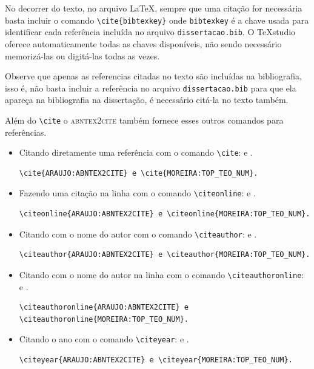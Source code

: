 \documentclass[fleqn]{profmat-cefet}
\newcommand{\TeXstudio}{\TeX\textsf{studio}}
\newcommand{\bibfile}  {\texttt{dissertacao.bib}}
\begin{document}
No decorrer do texto, no arquivo \LaTeX{}, sempre que uma citação for necessária
basta incluir o comando \lstinline!\cite{bibtexkey}! onde \lstinline!bibtexkey! é 
a chave usada para identificar cada referência incluída no arquivo 
\bibfile{}. O \TeXstudio{} oferece automaticamente todas as chaves disponíveis, 
não sendo necessário memorizá-las ou digitá-las todas as vezes.

Observe que apenas as referencias citadas no texto são incluídas na bibliografia,
isso é, não basta incluir a referência no arquivo \bibfile{}
para que ela apareça na bibliografia na dissertação, é necessário citá-la
no texto também. 

Além do \lstinline!\cite! o \textsc{abntex2cite} também fornece esses outros comandos
para referências.
\begin{itemize}
\item Citando diretamente uma referência com o comando \lstinline|\cite|: 
\cite{ARAUJO:ABNTEX2CITE} e \cite{MOREIRA:TOP_TEO_NUM}.
\begin{lstlisting}
\cite{ARAUJO:ABNTEX2CITE} e \cite{MOREIRA:TOP_TEO_NUM}.
\end{lstlisting}

\item Fazendo uma citação na linha com o comando \lstinline|\citeonline|: 
 e .
\begin{lstlisting}
\citeonline{ARAUJO:ABNTEX2CITE} e \citeonline{MOREIRA:TOP_TEO_NUM}.
\end{lstlisting}

\item Citando com o nome do autor com o comando \lstinline|\citeauthor|: 
\citeauthor{ARAUJO:ABNTEX2CITE} e \citeauthor{MOREIRA:TOP_TEO_NUM}.
\begin{lstlisting}
\citeauthor{ARAUJO:ABNTEX2CITE} e \citeauthor{MOREIRA:TOP_TEO_NUM}.
\end{lstlisting}

\item Citando com o nome do autor na linha com o comando \lstinline|\citeauthoronline|: 
 e .
\begin{lstlisting}
\citeauthoronline{ARAUJO:ABNTEX2CITE} e 
\citeauthoronline{MOREIRA:TOP_TEO_NUM}.
\end{lstlisting}

\item Citando o ano com o comando \lstinline|\citeyear|: 
\citeyear{ARAUJO:ABNTEX2CITE} e \citeyear{MOREIRA:TOP_TEO_NUM}.
\begin{lstlisting}
\citeyear{ARAUJO:ABNTEX2CITE} e \citeyear{MOREIRA:TOP_TEO_NUM}.
\end{lstlisting}
\end{itemize}
\end{document}
